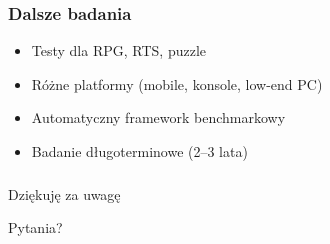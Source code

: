 \documentclass{beamer}
\begin{document}
\begin{frame}
  \frametitle{Dalsze badania}
  \begin{itemize}
    \item Testy dla RPG, RTS, puzzle
    \item Różne platformy (mobile, konsole, low-end PC)
    \item Automatyczny framework benchmarkowy
    \item Badanie długoterminowe (2--3 lata)
  \end{itemize}
\end{frame}

\begin{frame}
  \frametitle{}
  \vspace{2cm}
  \centering
  {\Large Dziękuję za uwagę}
  \vspace{1cm}

  {\normalsize Pytania?}
\end{frame}
\end{document}
